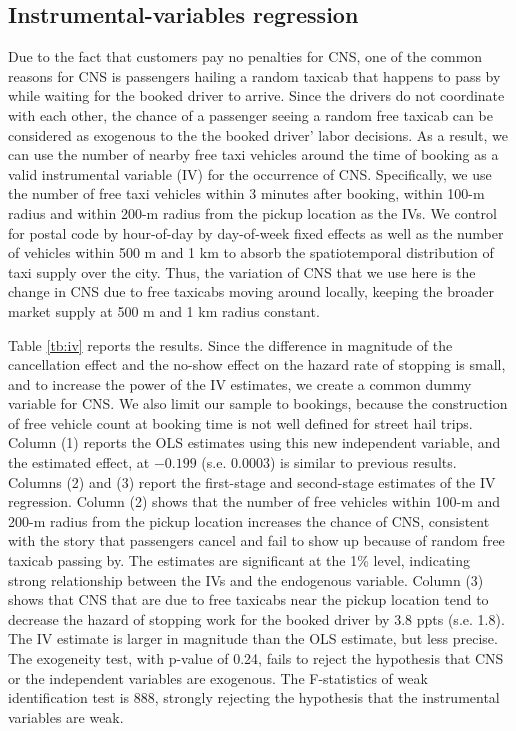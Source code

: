 \documentclass[reviewmode,AEJ]{AEA}
\begin{document}
\begin{appendices}
\begin{table}[htb]
\end{table}

\FloatBarrier
\section{Instrumental-variables regression}
\label{apx:iv}
Due to the fact that customers pay no penalties for CNS, one of the common reasons for CNS 
is passengers hailing a random taxicab that happens to pass by while waiting for the booked driver to arrive. 
Since the drivers do not coordinate with each other, the chance of a passenger seeing a random
free taxicab can be considered as exogenous to the the booked driver' labor decisions.
As a result, we can use the number of nearby free taxi vehicles around the time of 
booking as a valid instrumental variable (IV) for the occurrence of CNS.
Specifically, we use the number of free taxi vehicles within 3 minutes after booking, 
within 100-m radius and within 200-m radius from the pickup location as the IVs. We control for postal code by hour-of-day by day-of-week fixed effects as
well as the number of vehicles within 500 m and 1 km to absorb the spatiotemporal distribution
of taxi supply over the city. Thus, the variation of CNS that we use here is the change in CNS
due to free taxicabs moving around locally, keeping the broader market supply at 500 m and 1 km 
radius constant. 

Table \ref{tb:iv} reports the results. Since the difference in magnitude of the cancellation effect
and the no-show effect on the hazard rate of stopping is small, 
and to increase the power of the IV estimates, we create
a common dummy variable for CNS. We also limit our sample to bookings, because the construction
of free vehicle count at booking time is not well defined for street hail trips.
Column (1) reports the OLS estimates using this new
independent variable, and the estimated effect, at $-0.199$ (s.e. $0.0003$) is similar 
to previous results.
Columns (2) and (3) report the first-stage and second-stage estimates of the IV regression.
Column (2) shows that the number of free vehicles within 100-m and 200-m radius from 
the pickup location increases the chance of CNS, consistent with the story that
passengers cancel and fail to show up because of random free taxicab passing by.
The estimates are significant at the 1\% level, indicating strong relationship between the IVs
 and the endogenous variable.
Column (3) shows that CNS  that are due to free taxicabs near the pickup location
tend to decrease the hazard of stopping work for the booked driver by 3.8 ppts (s.e. 1.8).
The IV estimate is larger in magnitude than the OLS estimate, but less precise.
The exogeneity test, with p-value of 0.24, fails to reject the hypothesis that CNS or
the independent variables are exogenous. The F-statistics of weak identification test is 888, strongly rejecting the hypothesis that the instrumental variables are weak.



\end{appendices}
\end{document}
